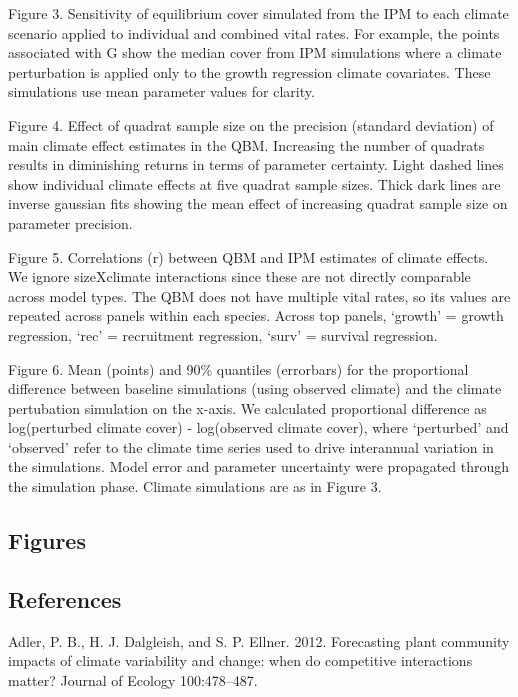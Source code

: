 \documentclass[12pt,]{article}
\begin{document}
Figure 3. Sensitivity of equilibrium cover simulated from the IPM to
each climate scenario applied to individual and combined vital rates.
For example, the points associated with G show the median cover from IPM
simulations where a climate perturbation is applied only to the growth
regression climate covariates. These simulations use mean parameter
values for clarity.

Figure 4. Effect of quadrat sample size on the precision (standard
deviation) of main climate effect estimates in the QBM. Increasing the
number of quadrats results in diminishing returns in terms of parameter
certainty. Light dashed lines show individual climate effects at five
quadrat sample sizes. Thick dark lines are inverse gaussian fits showing
the mean effect of increasing quadrat sample size on parameter
precision.

Figure 5. Correlations (r) between QBM and IPM estimates of climate
effects. We ignore sizeXclimate interactions since these are not
directly comparable across model types. The QBM does not have multiple
vital rates, so its values are repeated across panels within each
species. Across top panels, `growth' = growth regression, `rec' =
recruitment regression, `surv' = survival regression.

Figure 6. Mean (points) and 90\% quantiles (errorbars) for the
proportional difference between baseline simulations (using observed
climate) and the climate pertubation simulation on the x-axis. We
calculated proportional difference as log(perturbed climate cover) -
log(observed climate cover), where `perturbed' and `observed' refer to
the climate time series used to drive interannual variation in the
simulations. Model error and parameter uncertainty were propagated
through the simulation phase. Climate simulations are as in Figure 3.

\pagebreak{}

\subsection{Figures}\label{figures}

\pagebreak{}

\setcounter{page}{24}

\subsection*{References}\label{references}

Adler, P. B., H. J. Dalgleish, and S. P. Ellner. 2012. Forecasting plant
community impacts of climate variability and change: when do competitive
interactions matter? Journal of Ecology 100:478--487.
\end{document}
